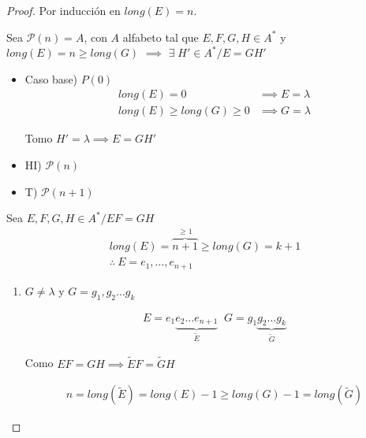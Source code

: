 \begin{proof} \phantom{.}

   Por inducción en $long(E) = n$.

   Sea $\mathcal{P}(n) = A$, con $A$ alfabeto tal que $E, F, G, H \in A^{*}$
   y $long(E) = n \geq long(G)$ $\implies$ $\exists \; H' \in A^{*} / E = GH'$

   \begin{itemize}
       \item Caso base) $P(0)$ 
           \begin{align*}
                long(E) = 0 &\implies E = \lambda \\
                long(E) \geq long(G) \geq 0 &\implies G = \lambda
           \end{align*}

           Tomo $H' = \lambda \implies E = GH'$

    \item HI) $\mathcal{P}(n)$

    \item T) $\mathcal{P}(n+1)$

   \end{itemize}

   \bigskip 

   Sea $E, F, G, H \in A^{*} / EF = GH$
   \begin{gather*}
       long(E) = \overbrace{n+1}^{\geq 1} \geq long(G) = k+1 \\
       \therefore ~  E = e_1, \dotsc, e_{n+1}
   \end{gather*}

    \begin{enumerate}[%
        labelindent=*,
        style=multiline,
        leftmargin=*,
        align=left,
        leftmargin=2\parindent,
        label=Caso \arabic*)]
        \item $G \neq \lambda$ y $G = g_1, g_2 \dots g_k$
           
            \begin{gather*}
                E = e_1 \underbrace{e_2 \dots e_{n+1}}_{\widetilde{E}} \; \; 
                G = g_1 \underbrace{g_2 \dots g_k}_{\widetilde{G}} 
            \end{gather*}

            Como $EF = GH \implies \widetilde{E} F = \widetilde{G}H$

            \begin{gather*}
                n = long(\widetilde{E}) = long(E) - 1 
                \geq long(G)-1 = long(\widetilde{G})
            \end{gather*}


\end{enumerate}
\end{proof}
